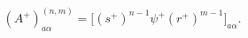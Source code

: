 \begin{equation}
\left( A^{+}\right)_{a\alpha }^{\left(n,m\right) }=
\Big[ \left( s^{+}\right) ^{n-1}\psi^{+}
\left( r^{+}\right)^{m-1} \Big] _{a\alpha }.
\end{equation}

